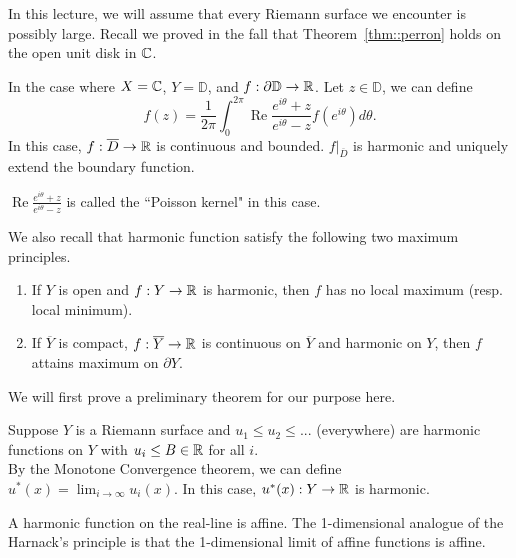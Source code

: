 \documentclass{article}
\begin{document}
{In this lecture, we will assume that every Riemann surface we encounter is possibly large. Recall we proved in the fall that Theorem~\ref{thm::perron} holds on the open unit disk in $\mathbb{C}$.
\begin{lemma}
    In the case where $X = \mathbb{C}$, $Y = \mathbb{D}$, and $f: \partial \mathbb{D} \to \mathbb{R}$. Let $z \in \mathbb{D}$, we can define
\[f(z) = \frac{1}{2\pi} \int_{0}^{2\pi} \operatorname{Re} \frac{e^{i\theta} + z}{e^{i\theta} - z} f(e^{i\theta}) d\theta.\]
In this case, $f: \overline{D} \to \mathbb{R}$ is continuous and bounded. $f|_{\overline{D}}$ is harmonic and uniquely extend the boundary function.
\end{lemma}

\begin{remark}
    $\operatorname{Re} \frac{e^{i\theta} + z}{e^{i\theta} - z}$ is called the ``Poisson kernel" in this case.
\end{remark}

We also recall that harmonic function satisfy the following two maximum principles.
\begin{theorem}
    \begin{enumerate}
        \item If $Y$ is open and $f: Y \to \mathbb{R}$ is harmonic, then $f$ has no local maximum (resp. local minimum).
        \item If $\overline{Y}$ is compact, $f: \overline{Y} \to \mathbb{R}$ is continuous on $\overline{Y}$ and harmonic on $Y$, then $f$ attains maximum on $\partial Y$. 
    \end{enumerate}
\end{theorem}

We will first prove a preliminary theorem for our purpose here.
\begin{theorem}
    Suppose $Y$ is a Riemann surface and $u_1 \leq u_2 \leq ...$ (everywhere) are harmonic functions on $Y$ with $u_i \leq B \in \mathbb{R}$ for all $i$.\\
    
    By the Monotone Convergence theorem, we can define $u^*(x) = \lim_{i \to \infty} u_i(x)$. In this case, $u^*(x): Y \to \mathbb{R}$ is harmonic.
\end{theorem}

\begin{remark}
    A harmonic function on the real-line is affine. The 1-dimensional analogue of the Harnack's principle is that the 1-dimensional limit of affine functions is affine.\\


\end{remark}}
\end{document}
